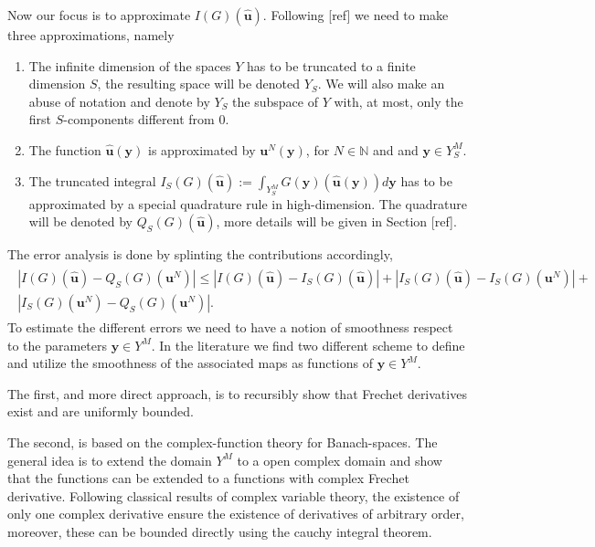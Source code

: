 \documentclass{article}
\newcommand{\todo}[1]{{\color{red}[#1]}}
\newcommand{\IN}{{\mathbb N}}
\begin{document}
Now our focus is to approximate $I(G)(\widehat{\mathbf{u}})$. Following \todo{ref} we need to make three approximations, namely
\begin{enumerate}
\item 
The infinite dimension of the spaces $Y$ has to be truncated to a finite dimension $S$, the resulting space will be denoted $Y_S$. We will also make an abuse of notation and denote by $Y_S$ the subspace of $Y$ with, at most, only the first $S$-components different from 0. 
\item 
The function $\widehat{\mathbf{u}}(\mathbf{y})$ is approximated by $\mathbf{u}^N(\mathbf{y})$, for $N \in \IN$ and and $\mathbf{y} \in Y_S^M$. 
\item 
The truncated integral $I_S(G)(\widehat{\mathbf{u}}):=\int_{Y_S^M} G(\mathbf{y})(\widehat{\mathbf{u}}(\mathbf{y}))d\mathbf{y}$ has to be approximated by a special quadrature rule in high-dimension. The quadrature will be denoted by $Q_S(G)(\widehat{\mathbf{u}})$, more details will be given in Section \todo{ref}.
\end{enumerate} 
The error analysis is done by splinting the contributions accordingly, 
\begin{align*}
\begin{split}
| I(G)(\widehat{\mathbf{u}}) - Q_S(G)(\mathbf{u}^N)| \leq 
|I(G)(\widehat{\mathbf{u}})  -I_S(G)(\widehat{\mathbf{u}})| +
|
I_S(G)(\widehat{\mathbf{u}})-
I_S(G)(\mathbf{u}^N)
| +\\
|
I_S(G)(\mathbf{u}^N)-
Q_S(G)(\mathbf{u}^N)
|.
\end{split}
\end{align*}
To estimate the different errors we need to have a notion of smoothness respect to the parameters $\mathbf{y} \in Y^M$. In the literature we find two different scheme to define and utilize the smoothness of the associated maps as functions of $\mathbf{y} \in Y^M$. 

The first, and more direct approach, is to recursibly show that Frechet derivatives exist and are uniformly bounded. 

The second, is based on the complex-function theory for Banach-spaces. The general idea is to extend the domain $Y^M$ to a open complex domain and show that the functions can be extended to a functions with complex Frechet derivative. Following classical results of complex variable theory, the existence of only one complex derivative ensure the existence of derivatives of arbitrary order, moreover, these can be bounded directly using the cauchy integral theorem. 
\end{document}
